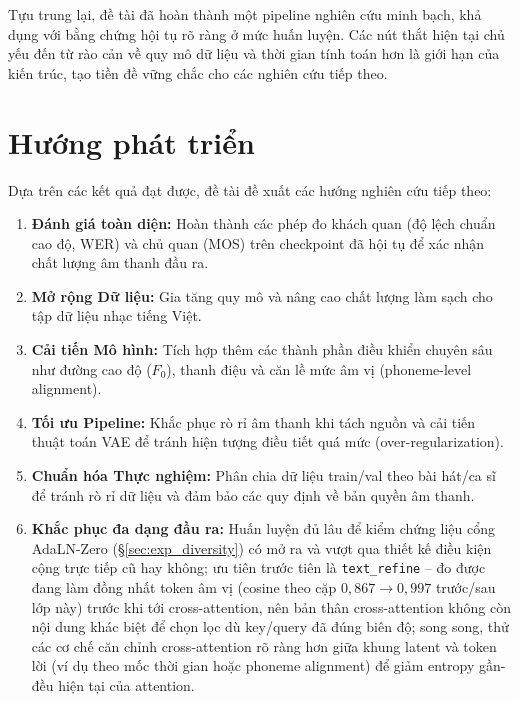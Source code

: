 \documentclass[a4paper,13pt,oneside]{report}
\begin{document}
Tựu trung lại, đề tài đã hoàn thành một pipeline nghiên cứu minh bạch, khả dụng với bằng chứng hội tụ rõ ràng ở mức huấn luyện. Các nút thắt hiện tại chủ yếu đến từ rào cản về quy mô dữ liệu và thời gian tính toán hơn là giới hạn của kiến trúc, tạo tiền đề vững chắc cho các nghiên cứu tiếp theo.

\section{Hướng phát triển}
\label{sec:future_work}

Dựa trên các kết quả đạt được, đề tài đề xuất các hướng nghiên cứu tiếp theo:
\begin{enumerate}[label=\arabic*)]
    \item \textbf{Đánh giá toàn diện:} Hoàn thành các phép đo khách quan (độ lệch chuẩn cao độ, WER) và chủ quan (MOS) trên checkpoint đã hội tụ để xác nhận chất lượng âm thanh đầu ra.
    \item \textbf{Mở rộng Dữ liệu:} Gia tăng quy mô và nâng cao chất lượng làm sạch cho tập dữ liệu nhạc tiếng Việt.
    \item \textbf{Cải tiến Mô hình:} Tích hợp thêm các thành phần điều khiển chuyên sâu như đường cao độ ($F_0$), thanh điệu và căn lề mức âm vị (phoneme-level alignment).
    \item \textbf{Tối ưu Pipeline:} Khắc phục rò rỉ âm thanh khi tách nguồn và cải tiến thuật toán VAE để tránh hiện tượng điều tiết quá mức (over-regularization).
    \item \textbf{Chuẩn hóa Thực nghiệm:} Phân chia dữ liệu train/val theo bài hát/ca sĩ để tránh rò rỉ dữ liệu và đảm bảo các quy định về bản quyền âm thanh.
    \item \textbf{Khắc phục đa dạng đầu ra:} Huấn luyện đủ lâu để kiểm chứng liệu cổng AdaLN-Zero (\S\ref{sec:exp_diversity}) có mở ra và vượt qua thiết kế điều kiện cộng trực tiếp cũ hay không; ưu tiên trước tiên là \texttt{text\_refine} -- đo được đang làm đồng nhất token âm vị (cosine theo cặp $0{,}867\to0{,}997$ trước/sau lớp này) trước khi tới cross-attention, nên bản thân cross-attention không còn nội dung khác biệt để chọn lọc dù key/query đã đúng biên độ; song song, thử các cơ chế căn chỉnh cross-attention rõ ràng hơn giữa khung latent và token lời (ví dụ theo mốc thời gian hoặc phoneme alignment) để giảm entropy gần-đều hiện tại của attention.
\end{enumerate}
\end{document}

